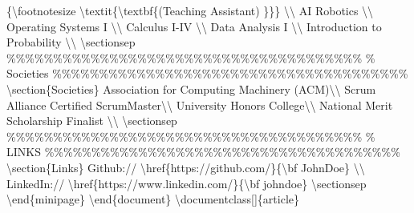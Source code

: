 \documentclass{article}%
\begin{document}
\{\textbackslash{}footnotesize \textbackslash{}textit\{\textbackslash{}textbf\{(Teaching Assistant) \}\}\} \textbackslash{}\textbackslash{}\newline%
AI Robotics \textbackslash{}\textbackslash{}\newline%
Operating Systems I \textbackslash{}\textbackslash{}\newline%
Calculus I{-}IV \textbackslash{}\textbackslash{}\newline%
Data Analysis I \textbackslash{}\textbackslash{}\newline%
Introduction to Probability \textbackslash{}\textbackslash{}\newline%
\textbackslash{}sectionsep\newline%
\newline%
\%\%\%\%\%\%\%\%\%\%\%\%\%\%\%\%\%\%\%\%\%\%\%\%\%\%\%\%\%\%\%\%\%\%\%\%\%\%\newline%
\%     Societies\newline%
\%\%\%\%\%\%\%\%\%\%\%\%\%\%\%\%\%\%\%\%\%\%\%\%\%\%\%\%\%\%\%\%\%\%\%\%\%\%\newline%
\newline%
\textbackslash{}section\{Societies\}\newline%
Association for Computing Machinery (ACM)\textbackslash{}\textbackslash{}\newline%
Scrum Alliance Certified ScrumMaster\textbackslash{}\textbackslash{}\newline%
University Honors College\textbackslash{}\textbackslash{}\newline%
National Merit Scholarship Finalist \textbackslash{}\textbackslash{}\newline%
\textbackslash{}sectionsep\newline%
\newline%
\%\%\%\%\%\%\%\%\%\%\%\%\%\%\%\%\%\%\%\%\%\%\%\%\%\%\%\%\%\%\%\%\%\%\%\%\%\%\newline%
\%     LINKS\newline%
\%\%\%\%\%\%\%\%\%\%\%\%\%\%\%\%\%\%\%\%\%\%\%\%\%\%\%\%\%\%\%\%\%\%\%\%\%\%\newline%
\newline%
\textbackslash{}section\{Links\}\newline%
Github:// \textbackslash{}href\{https://github.com/\}\{\textbackslash{}bf JohnDoe\} \textbackslash{}\textbackslash{}\newline%
LinkedIn://  \textbackslash{}href\{https://www.linkedin.com/\}\{\textbackslash{}bf johndoe\}\newline%
\textbackslash{}sectionsep\newline%
\newline%
\textbackslash{}end\{minipage\}\newline%
\textbackslash{}end\{document\}  \textbackslash{}documentclass{[}{]}\{article\}\newline%
%
\end{document}
